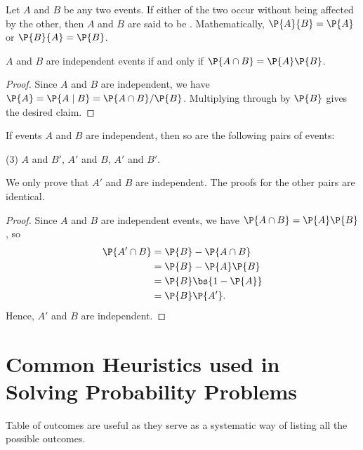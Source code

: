 \begin{definition}
    Let $A$ and $B$ be any two events. If either of the two occur without being affected by the other, then $A$ and $B$ are said to be . Mathematically, $\P{A}{B} = \P{A}$ or $\P{B}{A} = \P{B}$.
\end{definition}

\begin{proposition}
    $A$ and $B$ are independent events if and only if $\P{A \cap B} = \P{A}\P{B}$.
\end{proposition}
\begin{proof}
    Since $A$ and $B$ are independent, we have $\P{A} = \P{A \mid B} = \P{A \cap B}/\P{B}$. Multiplying through by $\P{B}$ gives the desired claim.
\end{proof}

\begin{proposition}
    If events $A$ and $B$ are independent, then so are the following pairs of events:
    \begin{tasks}[label=\textbullet](3)
        \task $A$ and $B'$,
        \task $A'$ and $B$,
        \task $A'$ and $B'$.
    \end{tasks}
\end{proposition}
We only prove that $A'$ and $B$ are independent. The proofs for the other pairs are identical.
\begin{proof}
    Since $A$ and $B$ are independent events, we have $\P{A \cap B} = \P{A} \P{B}$, so 
    \begin{align*}
        \P{A' \cap B} &= \P{B} - \P{A \cap B}\\
        &= \P{B} - \P{A}\P{B}\\
        &= \P{B} \bs{1 - \P{A}}\\
        &= \P{B} \P{A'}.
    \end{align*}
    Hence, $A'$ and $B$ are independent.
\end{proof}

\section{Common Heuristics used in Solving Probability Problems}

\begin{recipe}
    Table of outcomes are useful as they serve as a systematic way of listing all the possible outcomes.
\end{recipe}

